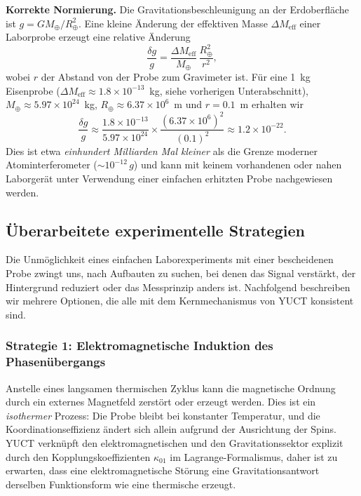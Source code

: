 \documentclass[12pt]{article}
\theoremstyle{remark}
\begin{document}
	\textbf{Korrekte Normierung.} Die Gravitationsbeschleunigung an der Erdoberfläche ist $g = G M_\oplus / R_\oplus^2$. Eine kleine Änderung der effektiven Masse $\Delta M_{\mathrm{eff}}$ einer Laborprobe erzeugt eine relative Änderung
	\begin{equation}
		\frac{\delta g}{g} = \frac{\Delta M_{\mathrm{eff}}}{M_\oplus}\,
		\frac{R_\oplus^2}{r^2},
		\label{eq:delta-g-correct}
	\end{equation}
	wobei $r$ der Abstand von der Probe zum Gravimeter ist. Für eine 1~kg Eisenprobe ($\Delta M_{\mathrm{eff}} \approx 1.8\times10^{-13}$~kg, siehe vorherigen Unterabschnitt), $M_\oplus \approx 5.97\times10^{24}$~kg, $R_\oplus \approx 6.37\times10^{6}$~m und $r = 0.1$~m erhalten wir
	\[
	\frac{\delta g}{g} \approx
	\frac{1.8\times10^{-13}}{5.97\times10^{24}} \times
	\frac{(6.37\times10^{6})^2}{(0.1)^2}
	\approx 1.2\times10^{-22}.
	\]
	Dies ist etwa \emph{einhundert Milliarden Mal kleiner} als die Grenze moderner Atominterferometer ($\sim 10^{-12}\,g$) und kann mit keinem vorhandenen oder nahen Laborgerät unter Verwendung einer einfachen erhitzten Probe nachgewiesen werden.
	
	\subsection{Überarbeitete experimentelle Strategien}
	\label{subsec:lab-revised}
	
	Die Unmöglichkeit eines einfachen Laborexperiments mit einer bescheidenen Probe zwingt uns, nach Aufbauten zu suchen, bei denen das Signal verstärkt, der Hintergrund reduziert oder das Messprinzip anders ist. Nachfolgend beschreiben wir mehrere Optionen, die alle mit dem Kernmechanismus von YUCT konsistent sind.
	
	\subsubsection*{Strategie 1: Elektromagnetische Induktion des Phasenübergangs}
	Anstelle eines langsamen thermischen Zyklus kann die magnetische Ordnung durch ein externes Magnetfeld zerstört oder erzeugt werden. Dies ist ein \emph{isothermer} Prozess: Die Probe bleibt bei konstanter Temperatur, und die Koordinationseffizienz ändert sich allein aufgrund der Ausrichtung der Spins. YUCT verknüpft den elektromagnetischen und den Gravitationssektor explizit durch den Kopplungskoeffizienten $\kappa_{01}$ im Lagrange-Formalismus, daher ist zu erwarten, dass eine elektromagnetische Störung eine Gravitationsantwort derselben Funktionsform wie eine thermische erzeugt.
	
\end{document}
